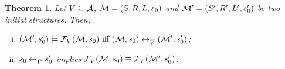 \documentclass{article}
\newtheorem{theorem}{Theorem}
\begin{document}
\begin{theorem}\label{CF}
Let $V\subseteq {\cal A}$, ${\cal M}=(S,R,L,s_0)$ and ${\cal M}'=(S',R', L',s_0')$ be two initial structures. Then,
\begin{enumerate}[(i)]
 \item $({\cal M}',s_0') \models {\cal F}_V({\cal M},s_0)
\text{ iff }
({\cal M},s_0) \leftrightarrow_{\overline V} ({\cal M}',s_0')$;

\item $s_0 \leftrightarrow_{\overline V} s_0'$ implies  ${\cal F}_V({\cal M}, s_0) \equiv {\cal F}_V({\cal M}', s_0')$.
\end{enumerate}

\end{theorem}




\end{document}
